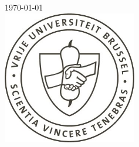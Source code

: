 \documentclass[11pt, a4paper,svgnames]{report}
\begin{document}
\begin{titlepage}
{\large \today}\\[3cm]


\includegraphics[width=2.3in]{vub_schild.jpg}\\[4cm] 
 







\end{titlepage}
\renewcommand{\mtctitle}{Chapter contents}



\dominitoc
\tableofcontents

\setcounter{mtc}{1}


\setcounter{mtc}{2}


\setcounter{mtc}{3}


\setcounter{mtc}{4}


\setcounter{mtc}{5}


\setcounter{mtc}{6}


\setcounter{mtc}{7}


\newpage


\end{document}
